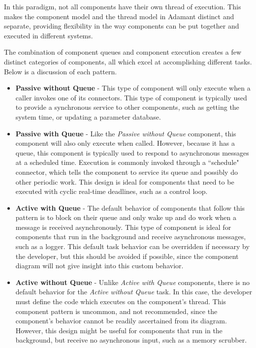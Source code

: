 In this paradigm, not all components have their own thread of execution. This makes the component model and the thread model in Adamant distinct and separate, providing flexibility in the way components can be put together and executed in different systems. 

The combination of component queues and component execution creates a few distinct categories of components, all which excel at accomplishing different tasks. Below is a discussion of each pattern.

\begin{itemize}
  \item \textbf{Passive without Queue} - This type of component will only execute when a caller invokes one of its connectors. This type of component is typically used to provide a synchronous service to other components, such as getting the system time, or updating a parameter database.
  \item \textbf{Passive with Queue} - Like the \textit{Passive without Queue} component, this component will also only execute when called. However, because it has a queue, this component is typically used to respond to asynchronous messages at a scheduled time. Execution is commonly invoked through a ``schedule" connector, which tells the component to service its queue and possibly do other periodic work. This design is ideal for components that need to be executed with cyclic real-time deadlines, such as a control loop.
  \item \textbf{Active with Queue} - The default behavior of components that follow this pattern is to block on their queue and only wake up and do work when a message is received asynchronously. This type of component is ideal for components that run in the background and receive asynchronous messages, such as a logger. This default task behavior can be overridden if necessary by the developer, but this should be avoided if possible, since the component diagram will not give insight into this custom behavior.
  \item \textbf{Active without Queue} - Unlike \textit{Active with Queue} components, there is no default behavior for the \textit{Active without Queue} task. In this case, the developer must define the code which executes on the component's thread. This component pattern is uncommon, and not recommended, since the component's behavior cannot be readily ascertained from its diagram. However, this design might be useful for components that run in the background, but receive no asynchronous input, such as a memory scrubber.
\end{itemize}

